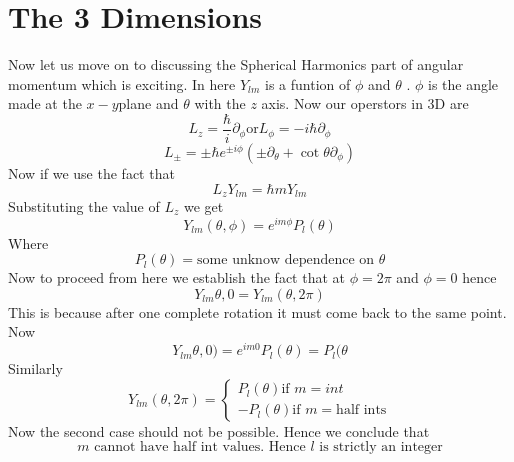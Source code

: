 \documentclass{article}
\begin{document}
\section{The 3 Dimensions}
Now let us move on to discussing the Spherical Harmonics part of angular momentum which is exciting. 
In here $Y_{lm}$ is a funtion of $\phi$ and $\theta$ . $\phi$ is the angle made at the $x-y$plane and $\theta$ with the $z$ axis. 
Now our operstors in 3D are
\begin{equation}
L_z=\frac{\hbar }{i}\partial_\phi \text{or} L_\phi=-i\hbar\partial_\phi
\end{equation}
\begin{equation}
L_{\pm}={\pm}\hbar e^{{\pm}i\phi}(\pm \partial_\theta + \cot{\theta}\partial_{\phi})
\end{equation}
Now  if we use the fact that 
\begin{equation}
L_zY_{lm}=\hbar mY_{lm}
\end{equation}
Substituting the value of $L_z$ we get 
\begin{equation}
Y_{lm}(\theta,\phi)=e^{im\phi}P_{l}(\theta)
\end{equation}
Where 
\begin{equation}
P_l(\theta)=\text{some unknow dependence on $\theta$}
\end{equation}
Now to proceed from here we establish the fact that at $\phi=2\pi$ and $\phi=0$ hence 
\begin{equation}
Y_{lm}{\theta,0 }=Y_{lm}(\theta,2\pi)
\end{equation}
This is because after one complete rotation it must come back to the same point. 
Now 
\begin{equation}
Y_{lm}{\theta,0)=e^{im0}P_l(\theta) = P_l(\theta}
\end{equation}
Similarly 
\begin{equation}
Y_{lm}(\theta,2\pi)=
\begin{cases}
P_l(\theta) \text{if $m=int$}
\\
-P_l(\theta) \text{if $m=$half ints}
\end{cases}
\end{equation}
Now the second case should not be possible. Hence we conclude that 
\begin{equation}
\text{$m$ cannot have half int values. Hence $l$ is strictly an integer}
\end{equation}
\end{document}
